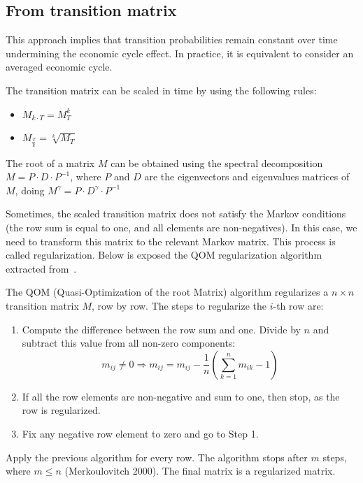 \documentclass[11pt,fleqn]{book} %
\begin{document}
\subsection{From transition matrix}
\label{pdftm}

This approach implies that transition probabilities remain constant
over time undermining the economic cycle effect. In practice, it is 
equivalent to consider an averaged economic cycle.

\begin{proposition}
	The transition matrix can be scaled in time by using the following rules:
	\begin{itemize}
		\item $M_{k \cdot T} = M_{T}^k$
		\item $M_{\frac{T}{k}} = \sqrt[k]{M_{T}}$
	\end{itemize}
\end{proposition}

The root of a matrix $M$ can be obtained using the spectral decomposition
$M = P \cdot D \cdot P^{-1}$, where $P$ and $D$ are the eigenvectors and
eigenvalues matrices of $M$, doing $M^{\gamma} = P \cdot D^{\gamma} \cdot P^{-1}$

Sometimes, the scaled transition matrix does not satisfy the Markov conditions
(the row sum is equal to one, and all elements are non-negatives). In this case, 
we need to transform this matrix to the relevant Markov matrix. This process is 
called regularization. Below is exposed the QOM regularization algorithm 
extracted from~\cite{kreinin:2001}.

\begin{algorithm}
	The QOM (Quasi-Optimization of the root Matrix) algorithm regularizes a 
	$n {\times} n$ transition matrix $M$, row by row. The steps to 
	regularize the $i$-th row are:
	\begin{enumerate}
		\item Compute the difference between the row sum and one. 
		Divide by $n$ and subtract this value from all non-zero components:
		\begin{displaymath}
			m_{ij} \ne 0 
			\Longrightarrow 
			m_{ij} = m_{ij} - \frac{1}{n} \left( \sum_{k=1}^{n} m_{ik} - 1\right)
		\end{displaymath}
		\item If all the row elements are non-negative and sum to one, 
		then stop, as the row is regularized.
		\item Fix any negative row element to zero and go to Step 1.
	\end{enumerate}
	
	Apply the previous algorithm for every row. The algorithm stops after $m$ 
	steps, where $m \le n$ (Merkoulovitch 2000). The final matrix is a regularized
	matrix. 
\end{algorithm}
\end{document}
